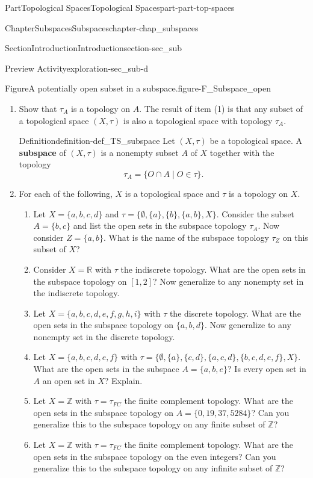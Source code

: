 \documentclass[oneside,10pt,]{book}
\newcommand{\terminology}[1]{\textbf{#1}}
\numberwithin{equation}{chapter}
\newcommand{\Z}{\mathbb{Z}}
\newcommand{\R}{\mathbb{R}}
\begin{document}
\begin{partptx}{Part}{Topological Spaces}{}{Topological Spaces}{}{}{part-part-top-spaces}
\begin{chapterptx}{Chapter}{Subspaces}{}{Subspaces}{}{}{chapter-chap_subspaces}
\begin{sectionptx}{Section}{Introduction}{}{Introduction}{}{}{section-sec_sub}
\begin{exploration}{Preview Activity}{}{exploration-sec_sub-d}
\begin{figureptx}{Figure}{A potentially open subset in a subspace.}{figure-F_Subspace_open}{}
\tcblower
\end{figureptx}%
\begin{enumerate}[font=\bfseries,label=(\alph*),ref=\alph*]%
\item\label{task-act_TS_subspace}Show that \(\tau_A\) is a topology on \(A\). The result of item (1) is that any subset of a topological space \((X,\tau)\) is also a topological space with topology \(\tau_A\).%
\begin{definition}{Definition}{}{definition-def_TS_subspace}%
%
Let \((X,\tau)\) be a topological space. A \terminology{subspace} of \((X,\tau)\) is a nonempty subset \(A\) of \(X\) together with the topology%
\begin{equation*}
\tau_A = \{O \cap A \mid O \in \tau\}\text{.}
\end{equation*}
%
\end{definition}
\item{}For each of the following, \(X\) is a topological space and \(\tau\) is a topology on \(X\).%
\begin{enumerate}[font=\bfseries,label=(\roman*),ref=\theenumi.\roman*]%
\item{}Let \(X= \{a,b,c,d\}\) and \(\tau = \{\emptyset, \{a\}, \{b\}, \{a,b\}, X \}\). Consider the subset \(A=\{b,c\}\) and list the open sets in the subspace topology \(\tau_A\). Now consider \(Z = \{a,b\}\). What is the name of the subspace topology \(\tau_Z\) on this subset of \(X\)?%
\item{}Consider \(X=\R\) with \(\tau\) the indiscrete topology. What are the open sets in the subspace topology on \([1,2]\)? Now generalize to any nonempty set in the indiscrete topology.%
\item{}Let \(X = \{a,b,c,d,e,f,g,h,i\}\) with \(\tau\) the discrete topology. What are the open sets in the subspace topology on \(\{a,b,d\}\). Now generalize to any nonempty set in the discrete topology.%
\item{}Let \(X= \{a,b,c,d,e,f\}\) with \(\tau = \{\emptyset,\{a\}, \{c,d\}, \{a,c,d\}, \{b,c,d,e,f\}, X\}\). What are the open sets in the subspace \(A = \{a, b, e\}\)? Is every open set in \(A\) an open set in \(X\)? Explain.%
\item{}Let \(X=\Z\) with \(\tau = \tau_{FC}\) the finite complement topology. What are the open sets in the subspace topology on \(A = \{0,19, 37, 5284\}\)? Can you generalize this to the subspace topology on any finite subset of \(\Z\)?%
\item{}Let \(X=\Z\) with \(\tau = \tau_{FC}\) the finite complement topology. What are the open sets in the subspace topology on the even integers? Can you generalize this to the subspace topology on any infinite subset of \(\Z\)?%

\end{enumerate}
\end{enumerate}
\end{exploration}
\end{sectionptx}
\end{chapterptx}
\end{partptx}
\end{document}
